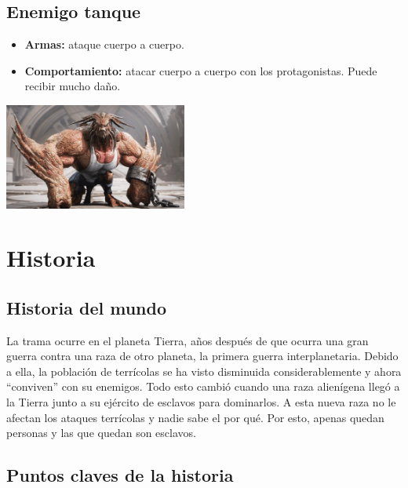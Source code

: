 \documentclass[twoside]{article}
\begin{document}
\subsection{Enemigo tanque}
\begin{itemize}
\item \textbf{Armas:} ataque cuerpo a cuerpo. 
\item \textbf{Comportamiento:} atacar cuerpo a cuerpo con los protagonistas. Puede recibir mucho daño. 
\end{itemize}

\begin{center}
\includegraphics[width=6cm]{./images/tanque.jpg}
\end{center}

\newpage
\pagestyle{insection}
\section{Historia}

\subsection{Historia del mundo}

La trama ocurre en el planeta Tierra, años después de que ocurra una gran guerra contra una raza de otro planeta, la primera guerra interplanetaria. Debido a ella, la población de terrícolas se ha visto disminuida considerablemente y ahora ``conviven'' con su enemigos. Todo esto cambió cuando una raza alienígena llegó a la Tierra junto a su ejército de esclavos para dominarlos. A esta nueva raza no le afectan los ataques terrícolas y nadie sabe el por qué. Por esto, apenas quedan personas y las que quedan son esclavos. 

\subsection{Puntos claves de la historia}
\end{document}
